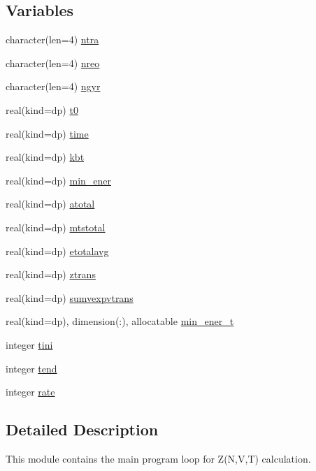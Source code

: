 \subsection*{Variables}
\begin{DoxyCompactItemize}
\item 
character(len=4) \hyperlink{namespacemod__loops_a79e040eb372f8de350337242a159e2b7}{ntra}
\item 
character(len=4) \hyperlink{namespacemod__loops_a2ee60c7992c0befa3757b0996e34c356}{nreo}
\item 
character(len=4) \hyperlink{namespacemod__loops_aa5002187d8846b45d30e6d3845cf1301}{ngyr}
\item 
real(kind=dp) \hyperlink{namespacemod__loops_ab6a118712ba0b676790e9cace45c35b5}{t0}
\item 
real(kind=dp) \hyperlink{namespacemod__loops_acb345fb5782ee4c7fd3c419baff2c135}{time}
\item 
real(kind=dp) \hyperlink{namespacemod__loops_a28f32cc48dca88b5eb914f3b51ff36c4}{kbt}
\item 
real(kind=dp) \hyperlink{namespacemod__loops_a17eba688dba567d251d70c4c22d9a1cb}{min\+\_\+ener}
\item 
real(kind=dp) \hyperlink{namespacemod__loops_a16597662d980828d74a9078f4b74e677}{atotal}
\item 
real(kind=dp) \hyperlink{namespacemod__loops_ae00fd72d753b56050294575eca6b68b1}{mtstotal}
\item 
real(kind=dp) \hyperlink{namespacemod__loops_ad69a647146ed54f5c84b96e742396716}{etotalavg}
\item 
real(kind=dp) \hyperlink{namespacemod__loops_a6975a502e7bc56e3b95ee8ed8db8e658}{ztrans}
\item 
real(kind=dp) \hyperlink{namespacemod__loops_a7c4cc7b204cbf0459e4519befe2b1ef5}{sumvexpvtrans}
\item 
real(kind=dp), dimension(\+:), allocatable \hyperlink{namespacemod__loops_a285da08b33e0b132d883ee82f39f6ea2}{min\+\_\+ener\+\_\+t}
\item 
integer \hyperlink{namespacemod__loops_adc96eb69b7265038868c81104240ee96}{tini}
\item 
integer \hyperlink{namespacemod__loops_a67ea99979384ac6268ae84f7bd2773ec}{tend}
\item 
integer \hyperlink{namespacemod__loops_ab4cd7025ac3ba99baaa6d706f7c7cdb7}{rate}
\end{DoxyCompactItemize}


\subsection{Detailed Description}
This module contains the main program loop for Z(\+N,\+V,\+T) calculation. 

